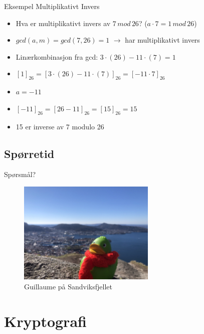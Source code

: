 \begin{frame}{Eksempel Multiplikativt Invers}
\begin{itemize}[<+->]
\item Hva er multiplikativt invers av $7\, mod\, 26$? ($a\cdot 7=1\, mod\, 26$)
\item $gcd(a,m) = gcd(7,26)=1$ $\rightarrow$ har multiplikativt invers
\item Linærkombinasjon fra gcd: $3\cdot (26)-11\cdot (7)=1$
\item $[1]_{26}=[3\cdot (26)-11\cdot (7)]_{26}=[-11\cdot 7]_{26}$
\item $a=-11$
\item $[-11]_{26}=[26-11]_{26}=[15]_{26}=15$
\item 15 er inverse av 7 modulo 26

\end{itemize}
\end{frame}

\subsection*{Spørretid}
\begin{frame}{Spørsmål?}
    \begin{figure}
        \centering
        \includegraphics[height = 4.9cm]{images/guillaume1.jpg}
        \caption{Guillaume på Sandviksfjellet}
        \label{fig:guillaume1}
    \end{figure}
\end{frame}


\section{Kryptografi}
